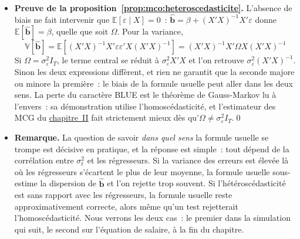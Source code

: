 \documentclass[10pt,a4paper]{article}
\newcommand{\siteurl}{https://le-mans.adjemian.eu/econometrics}
\newcommand{\chapref}[2]{\href{\siteurl/chapitre-#1.pdf}{chapitre~#2}}
\newcommand{\epsvar}{\sigma_{\varepsilon}^2}
\theoremstyle{definition}
\renewcommand{\newline}{\unskip\par\vspace{1.5pt}}
\begin{document}
\begin{notes}

  \begin{itemize}

  \item \textbf{Preuve de la proposition~\ref{prop:mco:heteroscedasticite}.}
    L'absence de biais ne fait intervenir que $\mathbb E[\varepsilon\mid X]=0$~:
    $\hat{\mathbf b}=\beta+(X'X)^{-1}X'\varepsilon$ donne
    $\mathbb E[\hat{\mathbf b}]=\beta$, quelle que soit $\Omega$. Pour la
    variance,
    \[
      \mathbb V\left[\hat{\mathbf b}\right] =
      \mathbb E\left[(X'X)^{-1}X'\varepsilon\varepsilon'X(X'X)^{-1}\right] =
      (X'X)^{-1}X'\Omega X(X'X)^{-1}
    \]
    Si $\Omega=\epsvar I_T$, le terme central se réduit à $\epsvar X'X$ et l'on
    retrouve $\epsvar(X'X)^{-1}$. Sinon les deux expressions diffèrent, et rien
    ne garantit que la seconde majore ou minore la première~: le biais de la
    formule usuelle peut aller dans les deux sens. La perte du caractère BLUE
    est le théorème de Gauss-Markov lu à l'envers~: sa démonstration utilise
    l'homoscédasticité, et l'estimateur des MCG du \chapref{2}{II} fait
    strictement mieux dès qu'$\Omega\neq\epsvar I_T$.\qed\newline

  \item \textbf{Remarque.} La question de savoir \emph{dans quel sens} la
    formule usuelle se trompe est décisive en pratique, et la réponse est
    simple~: tout dépend de la corrélation entre $\sigma_t^2$ et les régresseurs.
    Si la variance des erreurs est élevée là où les régresseurs s'écartent le
    plus de leur moyenne, la formule usuelle sous-estime la dispersion de
    $\hat{\mathbf b}$ et l'on rejette trop souvent. Si l'hétéroscédasticité est
    sans rapport avec les régresseurs, la formule usuelle reste approximativement
    correcte, alors même qu'un test rejetterait l'homoscédasticité. Nous
    verrons les deux cas~: le premier dans la simulation qui suit, le second sur
    l'équation de salaire, à la fin du chapitre.

  \end{itemize}

\end{notes}
\end{document}
